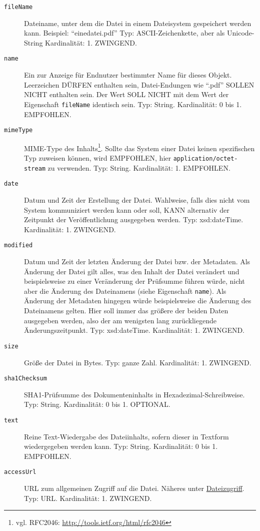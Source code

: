 \documentclass[,a4paper]{article}
\begin{document}
\begin{description}
\item[\texttt{fileName}]
Dateiname, unter dem die Datei in einem Dateisystem gespeichert werden
kann. Beispiel: ``einedatei.pdf'' Typ: ASCII-Zeichenkette, aber als
Unicode-String Kardinalität: 1. ZWINGEND.
\item[\texttt{name}]
Ein zur Anzeige für Endnutzer bestimmter Name für dieses Objekt.
Leerzeichen DÜRFEN enthalten sein, Datei-Endungen wie ``.pdf'' SOLLEN
NICHT enthalten sein. Der Wert SOLL NICHT mit dem Wert der Eigenschaft
\texttt{fileName} identisch sein. Typ: String. Kardinalität: 0 bis 1.
EMPFOHLEN.
\item[\texttt{mimeType}]
MIME-Type des Inhalts\footnote{vgl. RFC2046:
  \url{http://tools.ietf.org/html/rfc2046}}. Sollte das System einer
Datei keinen spezifischen Typ zuweisen können, wird EMPFOHLEN, hier
\texttt{application/octet-stream} zu verwenden. Typ: String.
Kardinalität: 1. EMPFOHLEN.
\item[\texttt{date}]
Datum und Zeit der Erstellung der Datei. Wahlweise, falls dies nicht vom
System kommuniziert werden kann oder soll, KANN alternativ der Zeitpunkt
der Veröffentlichung ausgegeben werden. Typ: xsd:dateTime. Kardinalität:
1. ZWINGEND.
\item[\texttt{modified}]
Datum und Zeit der letzten Änderung der Datei bzw. der Metadaten. Als
Änderung der Datei gilt alles, was den Inhalt der Datei verändert und
beispielsweise zu einer Veränderung der Prüfsumme führen würde, nicht
aber die Änderung des Dateinamens (siehe Eigenschaft \texttt{name}). Als
Änderung der Metadaten hingegen würde beispielsweise die Änderung des
Dateinamens gelten. Hier soll immer das größere der beiden Daten
ausgegeben werden, also der am wenigsten lang zurückliegende
Änderungszeitpunkt. Typ: xsd:dateTime. Kardinalität: 1. ZWINGEND.
\item[\texttt{size}]
Größe der Datei in Bytes. Typ: ganze Zahl. Kardinalität: 1. ZWINGEND.
\item[\texttt{sha1Checksum}]
SHA1-Prüfsumme des Dokumenteninhalts in Hexadezimal-Schreibweise. Typ:
String. Kardinalität: 0 bis 1. OPTIONAL.
\item[\texttt{text}]
Reine Text-Wiedergabe des Dateiinhalts, sofern dieser in Textform
wiedergegeben werden kann. Typ: String. Kardinalität: 0 bis 1.
EMPFOHLEN.
\item[\texttt{accessUrl}]
URL zum allgemeinen Zugriff auf die Datei. Näheres unter
\hyperref[dateizugriff]{Dateizugriff}. Typ: URL. Kardinalität: 1.
ZWINGEND.

\end{description}
\end{document}
